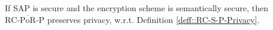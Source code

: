 \begin{lemma} If SAP is secure and the encryption scheme is semantically secure, then ${\text{RC-}\overline{\text{PoR}}\text{-P}}$ preserves privacy, w.r.t. Definition \ref{deff::RC-S-P-Privacy}. 
\end{lemma}

%
%
%

